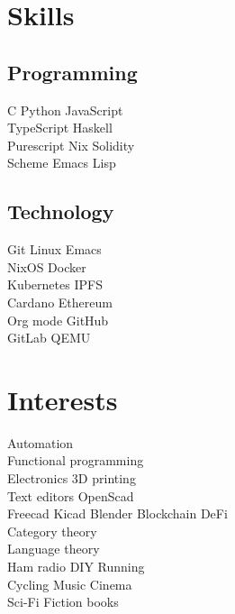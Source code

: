 \documentclass[]{cv}
\begin{document}
\begin{minipage}[t]{0.24\textwidth}


  \section{Skills}
  \subsection{Programming}
  \textbullet{} C
  \textbullet{} Python
  \textbullet{} JavaScript \\
  \textbullet{} TypeScript
  \textbullet{} Haskell \\
  \textbullet{} Purescript
  \textbullet{} Nix
  \textbullet{} Solidity \\
  \textbullet{} Scheme
  \textbullet{} Emacs Lisp

  \sectionsep

  \subsection{Technology}
  \textbullet{} Git
  \textbullet{} Linux
  \textbullet{} Emacs \\
  \textbullet{} NixOS
  \textbullet{} Docker \\
  \textbullet{} Kubernetes
  \textbullet{} IPFS \\
  \textbullet{} Cardano
  \textbullet{} Ethereum \\
  \textbullet{} Org mode
  \textbullet{} GitHub \\
  \textbullet{} GitLab
  \textbullet{} QEMU
  \sectionsep

  \section{Interests}
  \textbullet{} Automation  \\
  \textbullet{} Functional programming \\
  \textbullet{} Electronics
  \textbullet{} 3D printing \\
  \textbullet{} Text editors
  \textbullet{} OpenScad \\
  \textbullet{} Freecad
  \textbullet{} Kicad
  \textbullet{} Blender
  \textbullet{} Blockchain
  \textbullet{} DeFi  \\
  \textbullet{} Category theory  \\
  \textbullet{} Language theory   \\
  \textbullet{} Ham radio
  \textbullet{} DIY
  \textbullet{} Running  \\
  \textbullet{} Cycling
  \textbullet{} Music
  \textbullet{} Cinema  \\
  \textbullet{} Sci-Fi
  \textbullet{} Fiction books


\end{minipage}
\end{document}
